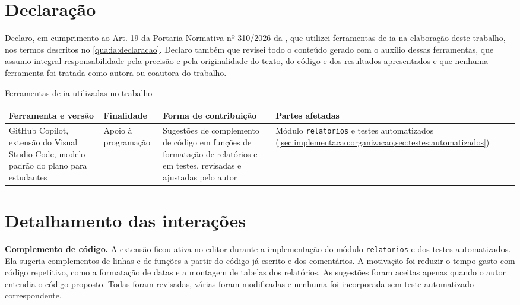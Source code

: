 \section{Declaração}

Declaro, em cumprimento ao Art. 19 da Portaria Normativa nº 310/2026 da
\imprimiruniversidade{} \cite{ufes2026portaria}, que utilizei ferramentas de
\acl{ia} na elaboração deste trabalho, nos termos descritos no
\cref{qua:ia:declaracao}. Declaro também que revisei todo o conteúdo gerado
com o auxílio dessas ferramentas, que assumo integral responsabilidade pela
precisão e pela originalidade do texto, do código e dos resultados
apresentados e que nenhuma ferramenta foi tratada como autora ou coautora do
trabalho.

\begin{quadro}[htbp]
  \centering
  \caption{Ferramentas de \acs{ia} utilizadas no trabalho}
  \label{qua:ia:declaracao}
  \small
  \begin{tabularx}{\textwidth}{|>{\raggedright\arraybackslash}p{2.8cm}|>{\raggedright\arraybackslash}X|>{\raggedright\arraybackslash}X|>{\raggedright\arraybackslash}p{2.6cm}|}
    \hline
    \textbf{Ferramenta e versão} & \textbf{Finalidade} &
      \textbf{Forma de contribuição} & \textbf{Partes afetadas} \\
    \hline
    GitHub Copilot, extensão do Visual Studio Code, modelo padrão do plano
      para estudantes \cite{github2026copilot} &
      Apoio à programação &
      Sugestões de complemento de código em funções de formatação de
      relatórios e em testes, revisadas e ajustadas pelo autor &
      Módulo \texttt{relatorios} e testes automatizados
      (\cref{sec:implementacao:organizacao,sec:testes:automatizados}) \\
    \hline
  \end{tabularx}
  \fonteautor
\end{quadro}

\section{Detalhamento das interações}

\textbf{Complemento de código.} A extensão ficou ativa no editor durante a
implementação do módulo \texttt{relatorios} e dos testes automatizados. Ela
sugeria complementos de linhas e de funções a partir do código já escrito e
dos comentários. A motivação foi reduzir o tempo gasto com código repetitivo,
como a formatação de datas e a montagem de tabelas dos relatórios. As
sugestões foram aceitas apenas quando o autor entendia o código proposto.
Todas foram revisadas, várias foram modificadas e nenhuma foi incorporada sem
teste automatizado correspondente.

